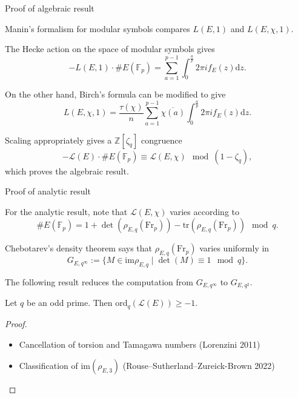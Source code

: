 \documentclass[10pt]{beamer}
\begin{document}
\begin{frame}[t]{Proof of algebraic result}

Manin's formalism for modular symbols compares $ L(E, 1) $ and $ L(E, \chi, 1) $.

\pause

\vspace{0.5cm} The Hecke action on the space of modular symbols gives $$ -L(E, 1) \cdot \#E(\mathbb{F}_p) = \sum_{a = 1}^{p - 1} \int_0^{\tfrac{a}{p}} 2\pi if_E(z)\mathrm{d}z. $$

\pause

On the other hand, Birch's formula can be modified to give $$ L(E, \chi, 1) = \dfrac{\tau(\chi)}{n}\sum_{a = 1}^{p - 1} \overline{\chi(a)}\int_0^{\tfrac{a}{p}} 2\pi if_E(z)\mathrm{d}z. $$

\pause

Scaling appropriately gives a $ \mathbb{Z}[\zeta_q] $ congruence $$ -\mathcal{L}(E) \cdot \#E(\mathbb{F}_p) \equiv \mathcal{L}(E, \chi) \mod (1 - \zeta_q), $$ which proves the algebraic result.

\end{frame}

\begin{frame}[t]{Proof of analytic result}

For the analytic result, note that $ \mathcal{L}(E, \chi) $ varies according to $$ \#E(\mathbb{F}_p) = 1 + \det(\rho_{E, q}(\mathrm{Fr}_p)) - \mathrm{tr}(\rho_{E, q}(\mathrm{Fr}_p)) \mod q. $$

\pause

Chebotarev's density theorem says that $ \rho_{E, q}(\mathrm{Fr}_p) $ varies uniformly in $$ G_{E, q^\infty} := \{M \in \mathrm{im}\rho_{E, q} \mid \det(M) \equiv 1 \mod q\}. $$

\pause

The following result reduces the computation from $ G_{E, q^\infty} $ to $ G_{E, q^2} $.

\begin{theorem}[A. 2024]
Let $ q $ be an odd prime. Then $ \mathrm{ord}_q(\mathcal{L}(E)) \ge -1 $.
\end{theorem}

\pause

\begin{proof}
\begin{itemize}
\item Cancellation of torsion and Tamagawa numbers (Lorenzini 2011)
\item Classification of $ \mathrm{im}(\rho_{E, 3}) $ (Rouse--Sutherland--Zureick-Brown 2022)
\end{itemize}
\end{proof}

\end{frame}
\end{document}
